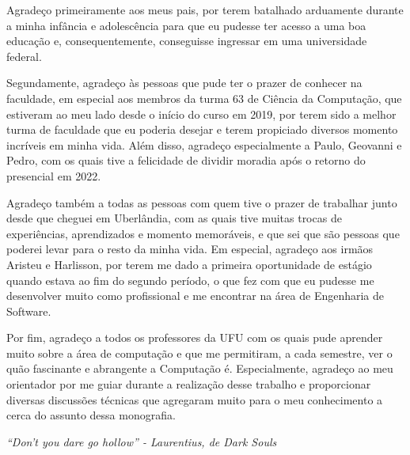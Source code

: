 \documentclass[12pt, %
openright, 
oneside, %
a4paper,    %
brazil]{facom-ufu-abntex2}
\begin{document}

\begin{agradecimentos}
    Agradeço primeiramente aos meus pais, por terem batalhado arduamente durante a minha infância e adolescência para que eu pudesse ter acesso a uma boa educação e, consequentemente, conseguisse ingressar em uma universidade federal.

    Segundamente, agradeço às pessoas que pude ter o prazer de conhecer na faculdade, em especial aos membros da turma 63 de Ciência da Computação, que estiveram ao meu lado desde o início do curso em 2019, por terem sido a melhor turma de faculdade que eu poderia desejar e terem propiciado diversos momento incríveis em minha vida. Além disso, agradeço especialmente a Paulo, Geovanni e Pedro, com os quais tive a felicidade de dividir moradia após o retorno do presencial em 2022.

    Agradeço também a todas as pessoas com quem tive o prazer de trabalhar junto desde que cheguei em Uberlândia, com as quais tive muitas trocas de experiências, aprendizados e momento memoráveis, e que sei que são pessoas que poderei levar para o resto da minha vida. Em especial, agradeço aos irmãos Aristeu e Harlisson, por terem me dado a primeira oportunidade de estágio quando estava ao fim do segundo período, o que fez com que eu pudesse me desenvolver muito como profissional e me encontrar na área de Engenharia de Software.

    Por fim, agradeço a todos os professores da UFU com os quais pude aprender muito sobre a área de computação e que me permitiram, a cada semestre, ver o quão fascinante e abrangente a Computação é. Especialmente, agradeço ao meu orientador por me guiar durante a realização desse trabalho e proporcionar diversas discussões técnicas que agregaram muito para o meu conhecimento a cerca do assunto dessa monografia.
\end{agradecimentos}

\begin{epigrafe}
    \vspace*{\fill}
    \begin{flushright}
        \textit{``Don't you dare go hollow'' - Laurentius, de Dark Souls}
    \end{flushright}
\end{epigrafe}
\end{document}
